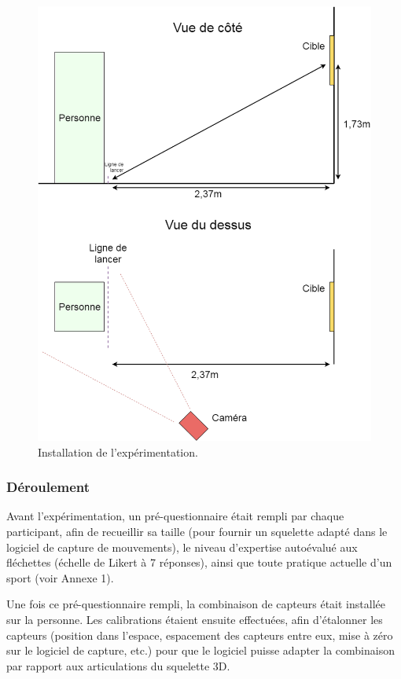 \begin{figure}
    \centering
    \includegraphics[width=\textwidth]{pictures/Darts_scheme.png}
    \caption{Installation de l'expérimentation.}
    \label{fig:Darts_scheme}
\end{figure}

\subsubsection{Déroulement}
Avant l'expérimentation, un pré-questionnaire était rempli par chaque participant, afin de recueillir sa taille (pour fournir un squelette adapté dans le logiciel de capture de mouvements), le niveau d'expertise autoévalué aux fléchettes (échelle de Likert à 7 réponses), ainsi que toute pratique actuelle d'un sport (voir Annexe 1).

Une fois ce pré-questionnaire rempli, la combinaison de capteurs était installée sur la personne. Les calibrations étaient ensuite effectuées, afin d'étalonner les capteurs (position dans l'espace, espacement des capteurs entre eux, mise à zéro sur le logiciel de capture, etc.) pour que le logiciel puisse adapter la combinaison par rapport aux articulations du squelette 3D.


